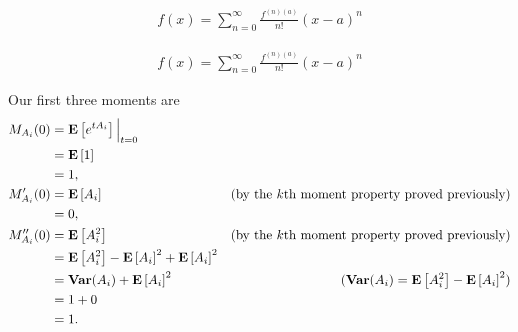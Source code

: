 \documentclass[11pt]{article}
\begin{document}
\begin{align*}
    f(x) = \sum\limits_{n=0}^\infty \frac{f^{(n)(a)}}{n!}(x-a)^n
\end{align*}

\begin{align*}
    f(x) = \sum\limits_{n=0}^\infty \frac{f^{(n)(a)}}{n!}(x-a)^n
\end{align*}

Our first three moments are
\begin{align*}
    M_{A_i}(0)                 & = \operatorname*{\mathbf{E}} \left[ e^{t A_i} \right] \Big|_{t=0}                                                                                                                 \\
                               & = \operatorname*{\mathbf{E}} \left[ 1 \right]                                                                                                                                     \\
                               & = 1,                                                                                                                                                      \\
    M_{A_i}^\prime(0)          & = \operatorname*{\mathbf{E}} \left[ A_i \right]                                                       & \text{(by the $k$th moment property proved previously)}                   \\
                               & = 0,                                                                                                                                                      \\
    M_{A_i}^{\prime \prime}(0) & = \operatorname*{\mathbf{E}} \left[ A_i^2 \right]                                                     & \text{(by the $k$th moment property proved previously)}                   \\
                               & = \operatorname*{\mathbf{E}} \left[ A_i^2 \right] - \operatorname*{\mathbf{E}} \left[ A_i \right]^2 + \operatorname*{\mathbf{E}} \left[ A_i \right]^2                                                                             \\
                               & = \operatorname*{\mathbf{Var}}(A_i) + \operatorname*{\mathbf{E}} \left[ A_i \right]^2                                         & \text{($\operatorname*{\mathbf{Var}}(A_i) = \operatorname*{\mathbf{E}} \left[ A_i^2 \right] - \operatorname*{\mathbf{E}} \left[ A_i \right]^2 $)} \\
                               & = 1 + 0                                                                                                                                                   \\
                               & = 1.
\end{align*}
\end{document}
